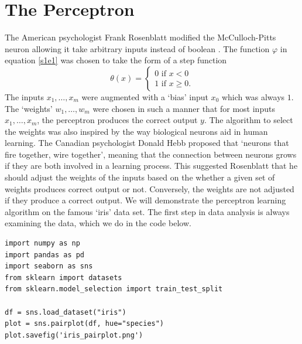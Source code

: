 \documentclass{article}
\numberwithin{equation}{section}
\begin{document}
\section{The Perceptron}\label{s2}
The American psychologist Frank Rosenblatt modified the McCulloch-Pitts neuron
allowing it take arbitrary inputs instead of boolean 
\cite{rosenblatt1958perceptron}. The function $\varphi$ in equation \eqref{s1e1}
was chosen to take the form of a step function
\begin{equation}\label{s2e1}
\theta(x) = \begin{cases}
0 \text{ if } x < 0 \\
1 \text{ if } x \ge 0.
\end{cases}
\end{equation}
The inputs $x_1, \ldots, x_m$ were augmented with a `bias' input $x_0$ which
was always $1$. The `weights' $w_1, \ldots, w_m$ were chosen in such a manner
that for most inputs $x_1, \ldots, x_m$, the perceptron produces the correct
output $y$. The algorithm to select the weights was also inspired by the way
biological neurons aid in human learning. The Canadian psychologist Donald Hebb
proposed \cite{hebb1949organization} that `neurons that fire together, wire
together', meaning that the connection between neurons grows if they are both
involved in a learning process. This suggested Rosenblatt that he should 
adjust the weights of the inputs based on the whether a given set of weights
produces correct output or not. Conversely, the weights are not adjusted if
they produce a correct output. We will demonstrate the perceptron learning
algorithm on the famous `iris' data set. The first step in data analysis is
always examining the data, which we do in the code below.
\begin{verbatim}
import numpy as np
import pandas as pd
import seaborn as sns
from sklearn import datasets
from sklearn.model_selection import train_test_split

df = sns.load_dataset("iris")
plot = sns.pairplot(df, hue="species")
plot.savefig('iris_pairplot.png')
\end{verbatim}
\end{document}
